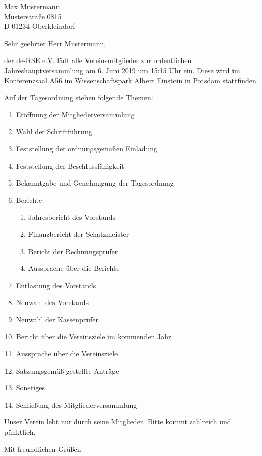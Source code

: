 \documentclass[../Vorlagen/de-RSE_Brief,a4paper]{scrlttr2}
\begin{document}

\begin{letter}{
    Max Mustermann\\
    Musterstraße 0815\\
    D-01234 Oberkleindorf
}
\opening{Sehr geehrter Herr Mustermann,}

der de-RSE e.V. lädt alle Vereinsmitglieder zur ordentlichen Jahreshauptversammlung am 6. Juni 2019 um 15:15 Uhr ein.
Diese wird im Konferenzsaal A56 im Wissenschaftspark Albert Einstein in Potsdam stattfinden.

\vspace{2em}
Auf der Tagesordnung stehen folgende Themen:
\begin{enumerate}
\setlength\itemsep{0em}
\item Eröffnung der Mitgliederversammlung
\item Wahl der Schriftführung
\item Feststellung der ordnungsgemäßen Einladung
\item Feststellung der Beschlussfähigkeit
\item Bekanntgabe und Genehmigung der Tagesordnung
\item Berichte
\begin{enumerate}
 \item Jahresbericht des Vorstands
 \item Finanzbericht der Schatzmeister
 \item Bericht der Rechnungsprüfer
 \item Aussprache über die Berichte
\end{enumerate}
\item Entlastung des Vorstands
\item Neuwahl des Vorstands
\item Neuwahl der Kassenprüfer
\item Bericht über die Vereinsziele im kommenden Jahr
\item Aussprache über die Vereinsziele
\item Satzungsgemäß gestellte Anträge
\item Sonstiges
\item Schließung des Mitgliederversammlung
\end{enumerate}

Unser Verein lebt nur durch seine Mitglieder. Bitte kommt zahlreich und pünktlich.

\closing{Mit freundlichen Grüßen}
\end{letter}
\end{document}
